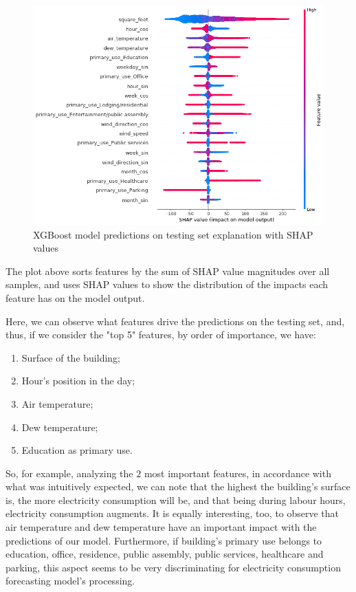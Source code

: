 \documentclass[twocolumn, switch]{article}
\begin{document}
\begin{figure}[H]
\centering
\includegraphics[scale=0.3]{../graphs/shap_values_summary_plot_electricity}
\caption{XGBoost model predictions on testing set explanation with SHAP values}
\label{fig:shap_values_summary_plot_electricity}
\end{figure}

The plot above sorts features by the sum of SHAP value magnitudes over all samples, and uses SHAP values to show the distribution of the impacts each feature has on the model output.

Here, we can observe what features drive the predictions on the testing set, and, thus, if we consider the "top 5" features, by order of importance, we have:

\begin{enumerate}
\item Surface of the building;
\item Hour's position in the day;
\item Air temperature;
\item Dew temperature;
\item Education as primary use.
\end{enumerate}

So, for example, analyzing the $2$ most important features, in accordance with what was intuitively expected, we can note that the highest the building's surface is, the more electricity consumption will be, and that being during labour hours, electricity consumption augments. It is equally interesting, too, to observe that air temperature and dew temperature have an important impact with the predictions of our model. Furthermore, if building's primary use belongs to education, office, residence, public assembly, public services, healthcare and parking, this aspect seems to be very discriminating for electricity consumption forecasting model's processing.
\end{document}
